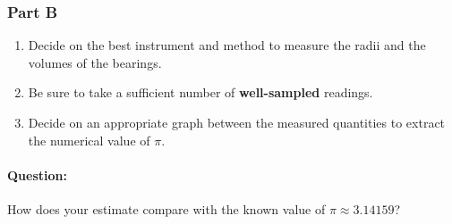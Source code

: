\subsubsection{Part B}

\begin{enumerate}
    \item Decide on the best instrument and method to measure the radii and the volumes of the bearings.
    
    \item Be sure to take a sufficient number of \textbf{well-sampled} readings.
    
    \item Decide on an appropriate graph between the measured quantities to extract the numerical value of $\pi$.
\end{enumerate}

\begin{question}
\paragraph{Question:} How does your estimate compare with the known value of $\pi \approx 3.14159$?
\end{question}



\newpage
